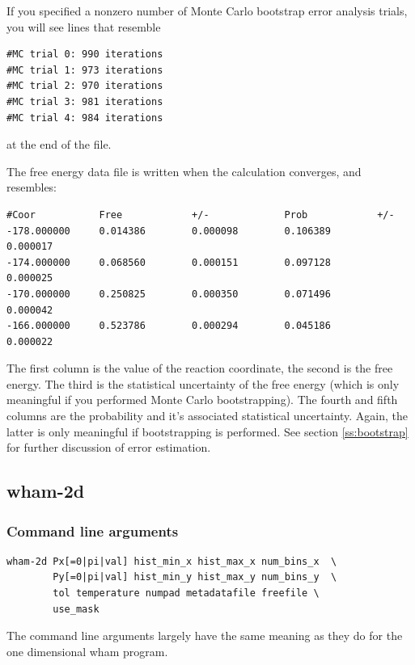 \documentclass[12pt]{article}
\begin{document}
If you specified a nonzero number of Monte Carlo bootstrap error analysis
trials, you will see lines that resemble

\begin{verbatim}
#MC trial 0: 990 iterations
#MC trial 1: 973 iterations
#MC trial 2: 970 iterations
#MC trial 3: 981 iterations
#MC trial 4: 984 iterations
\end{verbatim}

at the end of the file.

The free energy data file is written when the calculation converges, and
resembles:

\begin{verbatim}
#Coor           Free            +/-             Prob            +/-
-178.000000     0.014386        0.000098        0.106389        0.000017
-174.000000     0.068560        0.000151        0.097128        0.000025
-170.000000     0.250825        0.000350        0.071496        0.000042
-166.000000     0.523786        0.000294        0.045186        0.000022
\end{verbatim}

The first column is the value of the reaction coordinate, the second is the
free energy.  The third is the statistical uncertainty of the free energy
(which is only meaningful if you performed Monte Carlo bootstrapping).  The
fourth and fifth columns are the probability and it's associated
statistical uncertainty.  Again, the latter is only meaningful if
bootstrapping is performed.  See section \ref{ss:bootstrap} for further
discussion of error estimation.

\subsection{wham-2d}

\subsubsection{Command line arguments}

\begin{verbatim}
wham-2d Px[=0|pi|val] hist_min_x hist_max_x num_bins_x  \
        Py[=0|pi|val] hist_min_y hist_max_y num_bins_y  \
        tol temperature numpad metadatafile freefile \
        use_mask
\end{verbatim}

The command line arguments largely have the same meaning as they do for the
one dimensional wham program.
\end{document}
